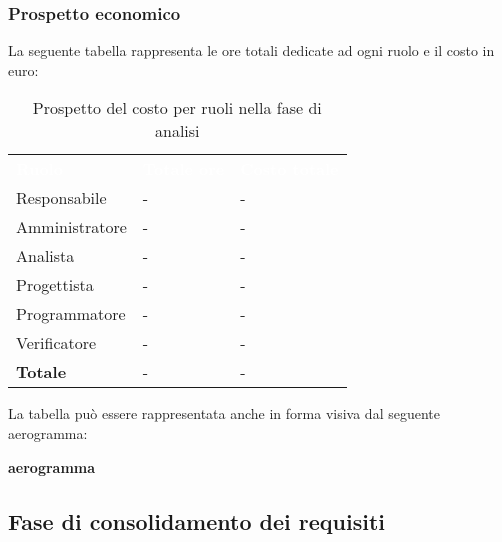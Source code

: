 \subsubsection{Prospetto economico}
La seguente tabella rappresenta le ore totali dedicate ad ogni ruolo e il costo in euro:

\begin{table}[!htbp]
\begin{center}
\renewcommand{\arraystretch}{1.5}
\begin{tabular}{ m{}<{\centering}  m{}<{\centering} m{}<{\centering}}
	\rowcolor{darkblue}
	\textcolor{white}{\textbf{Ruolo}}&\textcolor{white}{\textbf{Totale ore}}&\textcolor{white}{\textbf{Costo totale}}\\ 

	Responsabile  & - & - \\	

	\rowcolor{gray!10} Amministratore & - & - \\
	
	Analista & - & - \\
	
	\rowcolor{gray!10} Progettista & - & - \\
	
	Programmatore & - & - \\
	
	\rowcolor{gray!10} Verificatore & - & - \\
	
	\textbf{Totale} & - & - \\
	
\end{tabular}
\caption{Prospetto del costo per ruoli nella fase di analisi}
\end{center}
\end{table}

La tabella può essere rappresentata anche in forma visiva dal seguente aerogramma:

\textbf{aerogramma}



\subsection{Fase di consolidamento dei requisiti}
